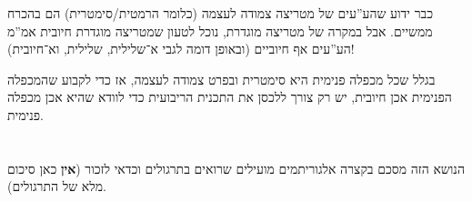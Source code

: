 \documentclass[name=רשימות אלגברה לינארית 2א]{../../../tex/classes/megasumPreamble}
\begin{document}
	כבר ידוע שהע''עים של מטריצה צמודה לעצמה (כלומר הרמטית/סימטרית) הם בהכרח ממשיים. אבל במקרה של מטריצה מוגדרת, נוכל לטעון שמטריצה מוגדרת חיובית אמ''מ הע''עים אף חיוביים (ובאופן דומה לגבי א־שלילית, שלילית, וא־חיובית)!
	
	בגלל שכל מכפלה פנימית היא סימטרית ובפרט צמודה לעצמה, אז כדי לקבוע שהמכפלה הפנימית אכן חיובית, יש רק צורך ללכסן את התכנית הריבועית כדי לוודא שהיא אכן מכפלה פנימית. 
	
	\npage
	
	\section[אלגוריתמים]{}
	הנושא הזה מסכם בקצרה אלגוריתמים מועילים שרואים בתרגולים וכדאי לזכור (\textbf{אין} כאן סיכום מלא של התרגולים). 
	
\end{document}
